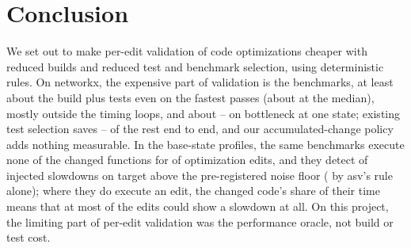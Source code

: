 \section{Conclusion}
\label{sec:conclusion}

We set out to make per-edit validation of code optimizations cheaper with reduced builds and reduced test and benchmark selection, using deterministic rules.
On networkx, the expensive part of validation is the benchmarks, at least about \NxBenchRatioTypical\x{} the build plus tests even on the fastest passes (about \NxBenchRatioMedian\x{} at the median), mostly outside the timing loops, and about \BnBenchRatioLo--\BnBenchRatioHi\x{} on bottleneck at one state; existing test selection saves \TestmonRatioLo--\TestmonRatioHi\x{} of the rest end to end, and our accumulated-change policy adds nothing measurable.
In the base-state profiles, the same benchmarks execute none of the changed functions for \BOneAgentUnreached{} of \NxAgentOpt{} optimization edits, and they detect \FloorDetect{} of \NumSlowdowns{} injected slowdowns on target above the pre-registered noise floor (\SlowDetOnTarget{} by asv's rule alone); where they do execute an edit, the changed code's share of their time means that at most \EditsClearMid{} of the \NxAgentOpt{} edits could show a \PowFactorMid\x{} slowdown at all.
On this project, the limiting part of per-edit validation was the performance oracle, not build or test cost.
